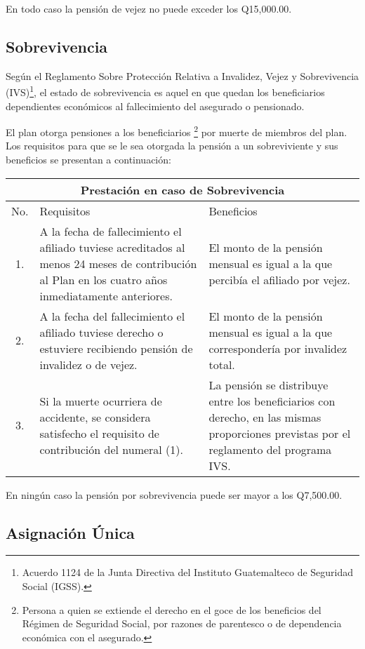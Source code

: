 \documentclass[12pt,letterpaper,titlepage]{article}
\begin{document}
{En todo caso la pensión de vejez no puede exceder los Q15,000.00.


\subsection{Sobrevivencia}

Según el Reglamento Sobre Protección Relativa a Invalidez, Vejez y Sobrevivencia (IVS)\footnote{Acuerdo 1124 de la Junta Directiva del Instituto Guatemalteco de Seguridad Social (IGSS).}, el estado de sobrevivencia es aquel en que quedan los beneficiarios dependientes económicos al fallecimiento del asegurado o pensionado.


El plan otorga pensiones a los beneficiarios \footnote{Persona a quien se extiende el derecho en el goce de los beneficios del Régimen de Seguridad Social, por razones de parentesco o de dependencia económica con el asegurado.} por muerte de miembros del plan. Los requisitos para que se le sea otorgada la pensión a un sobreviviente y sus beneficios se presentan a continuación:

\begin{center}
	\begin{tabular}{|c||p{6cm}||p{6cm}|}
		\hline 
		\multicolumn{3}{|c|}{Prestación en caso de Sobrevivencia} \\ 
		\hline
		\hline 
		No. & Requisitos & Beneficios \\ 
		\hline
		1. & A la fecha de fallecimiento el afiliado tuviese acreditados al menos 24 meses de contribución al Plan en los cuatro años inmediatamente anteriores. & El monto de la pensión mensual es igual a la que percibía el afiliado por vejez. \\ 
		\hline
		2. & A la fecha del fallecimiento el afiliado tuviese derecho o estuviere recibiendo pensión de invalidez o de vejez. & El monto de la pensión mensual es igual a la que correspondería por invalidez total. \\ 
		\hline 
		3. & Si la muerte ocurriera de accidente, se considera satisfecho el requisito de contribución del numeral (1). & La pensión se distribuye entre los beneficiarios con derecho, en las mismas proporciones previstas por el reglamento del programa IVS. \\ 
		\hline
	\end{tabular} 
\end{center}

En ningún caso la pensión por sobrevivencia puede ser mayor a los Q7,500.00.

\subsection{Asignación Única}

}
\end{document}
